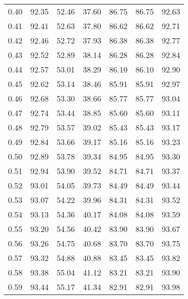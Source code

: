 \begin{tabular}{|c|c|c|c|c|c|c|}
      0.40 &     92.35 &     52.46 &      37.60 &   86.75 &      86.75 &         92.63 \\
      0.41 &     92.41 &     52.63 &      37.80 &   86.62 &      86.62 &         92.71 \\
      0.42 &     92.46 &     52.72 &      37.93 &   86.38 &      86.38 &         92.77 \\
      0.43 &     92.52 &     52.89 &      38.14 &   86.28 &      86.28 &         92.84 \\
      0.44 &     92.57 &     53.01 &      38.29 &   86.10 &      86.10 &         92.90 \\
      0.45 &     92.62 &     53.14 &      38.46 &   85.91 &      85.91 &         92.97 \\
      0.46 &     92.68 &     53.30 &      38.66 &   85.77 &      85.77 &         93.04 \\
      0.47 &     92.74 &     53.44 &      38.85 &   85.60 &      85.60 &         93.11 \\
      0.48 &     92.79 &     53.57 &      39.02 &   85.43 &      85.43 &         93.17 \\
      0.49 &     92.84 &     53.66 &      39.17 &   85.16 &      85.16 &         93.23 \\
      0.50 &     92.89 &     53.78 &      39.34 &   84.95 &      84.95 &         93.30 \\
      0.51 &     92.94 &     53.90 &      39.52 &   84.71 &      84.71 &         93.37 \\
      0.52 &     93.01 &     54.05 &      39.73 &   84.49 &      84.49 &         93.44 \\
      0.53 &     93.07 &     54.22 &      39.96 &   84.31 &      84.31 &         93.52 \\
      0.54 &     93.13 &     54.36 &      40.17 &   84.08 &      84.08 &         93.59 \\
      0.55 &     93.20 &     54.56 &      40.42 &   83.90 &      83.90 &         93.67 \\
      0.56 &     93.26 &     54.75 &      40.68 &   83.70 &      83.70 &         93.75 \\
      0.57 &     93.32 &     54.88 &      40.88 &   83.45 &      83.45 &         93.82 \\
      0.58 &     93.38 &     55.04 &      41.12 &   83.21 &      83.21 &         93.90 \\
      0.59 &     93.44 &     55.17 &      41.34 &   82.91 &      82.91 &         93.98 \\

\end{tabular}
